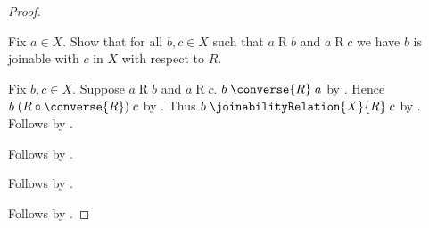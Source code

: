 \begin{proof}
\begin{subproof}
        \begin{subproof}
            Fix $a\in X$.
            Show that for all $b,c\in X$ such that
                $a\mathrel{R}b$ and $a\mathrel{R}c$ we have
                $b$ is joinable with $c$ in $X$ with respect to $R$.
            \begin{subproof}
                Fix $b,c\in X$.
                Suppose $a\mathrel{R}b$ and $a\mathrel{R}c$.
                $b\mathrel{\converse{R}}a$ by .
                Hence $b\mathrel{(R\circ\converse{R})}c$
                    by .
                Thus $b\mathrel{\joinabilityRelation{X}{R}}c$
                    by .
                Follows by .
            \end{subproof}
            Follows by .
        \end{subproof}
        Follows by .
    \end{subproof}
    Follows by \auto.
\end{proof}
